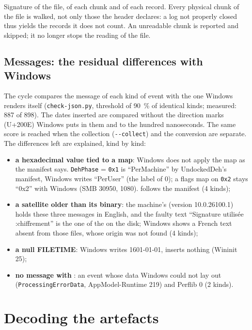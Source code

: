 \documentclass[11pt,a4paper,oneside]{report}
\begin{document}
Signature of the file, of each chunk and of each record. Every physical chunk
of the file is walked, not only those the header declares: a log not properly
closed thus yields the records it does not count. An unreadable chunk is
reported and skipped; it no longer stops the reading of the file.

\subsection*{Messages: the residual differences with Windows}

The cycle compares the message of each kind of event with the one Windows
renders itself (\texttt{check-json.py}, threshold of 90~\% of identical kinds;
measured: 887 of 898). The dates inserted are compared without the direction
marks (U+200E) Windows puts in them and to the hundred nanoseconds. The same
score is reached when the collection (\texttt{-{}-collect}) and the conversion
are separate. The differences left are explained, kind by kind:
\begin{itemize}
  \item \textbf{a hexadecimal value tied to a map}: Windows does not apply the
        map as the manifest says. \texttt{DehPhase} = \texttt{0x1} is
        ``PerMachine'' by UndockedDeh's manifest, Windows writes ``PerUser''
        (the label of 0); a flags map on \texttt{0x2} stays ``0x2'' with
        Windows (SMB 30950, 1080). \wac{} follows the manifest (4 kinds);
  \item \textbf{a satellite older than its binary}: the machine's
         (version 10.0.26100.1)
        holds these three messages in English, and the faulty text ``Signature
        utilisée :chiffrement'' is the one of the  on
        the disk; Windows shows a French text absent from those files, whose
        origin was not found (4 kinds);
  \item \textbf{a null FILETIME}: Windows writes 1601-01-01, \wac{} inserts
        nothing (Wininit 25);
  \item \textbf{no message with \wac{}}: an event whose data Windows could not
        lay out (\texttt{ProcessingErrorData}, AppModel-Runtime 219) and
        Perflib 0 (2 kinds).
\end{itemize}

\section{Decoding the artefacts}
\end{document}
